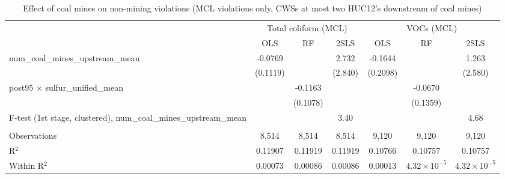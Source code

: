 
\begin{table}[htbp]
   
   \caption{\label{2sls_dwnstrm2step_nonminevio_mcl} Effect of coal mines on non-mining violations (MCL violations only, CWSs at most two HUC12's downstream of coal mines)}
   \bigskip
   
   \centering
   
   \begin{adjustbox}{width = \textwidth, center}
      
      
      \begin{tabular}{lcccccc}
         \toprule
         
          & \multicolumn{3}{c}{Total coliform (MCL)} & \multicolumn{3}{c}{VOCs (MCL)}\\
         
                                                                             & OLS           & RF            & 2SLS          & OLS           & RF                    & 2SLS\\  
         
         \midrule 
         num\_coal\_mines\_upstream\_mean                                    & -0.0769       &               & 2.732         & -0.1644       &                       & 1.263\\   
                                                                             & (0.1119)      &               & (2.840)       & (0.2098)      &                       & (2.580)\\   
         post95 $\times$ sulfur\_unified\_mean                               &               & -0.1163       &               &               & -0.0670               &   \\   
                                                                             &               & (0.1078)      &               &               & (0.1359)              &   \\   
         
         F-test (1st stage, clustered), num\_coal\_mines\_upstream\_mean     &               &               & 3.40          &               &                       & 4.68\\  
         
          \\
         
         Observations                                                        & 8,514         & 8,514         & 8,514         & 9,120         & 9,120                 & 9,120\\  
         R$^2$                                                               & 0.11907       & 0.11919       & 0.11919       & 0.10766       & 0.10757               & 0.10757\\  
         Within R$^2$                                                        & 0.00073       & 0.00086       & 0.00086       & 0.00013       & $4.32\times 10^{-5}$  & $4.32\times 10^{-5}$\\   
         

\end{tabular}
\end{adjustbox}
\end{table}
